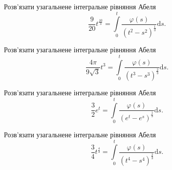 \documentclass[12pt]{extarticle}
\begin{document}
\begin{Exercise}
Розв’язати узагальнене інтегральне рівняння Абеля \[\dfrac{9}{20} t^{\frac{10}{3}} = \int\limits_{0}^{t} \dfrac{\varphi(s)}{(t^2-s^2)^{\frac{1}{3}}} \mathrm{d}s.\]
\end{Exercise}

\begin{Exercise}
Розв’язати узагальнене інтегральне рівняння Абеля \[\dfrac{4\pi}{9\sqrt{3}} t^3 = \int\limits_{0}^{t} \dfrac{\varphi(s)}{(t^3-s^3)^{\frac{2}{3}}} \mathrm{d}s.\]
\end{Exercise}

\begin{Exercise}
Розв’язати узагальнене інтегральне рівняння Абеля \[\dfrac{3}{2} e^{t} = \int\limits_{0}^{t} \dfrac{\varphi(s)}{(e^t-e^s)^{\frac{1}{3}}} \mathrm{d}s.\]
\end{Exercise}

\begin{Exercise}
Розв’язати узагальнене інтегральне рівняння Абеля \[\dfrac{3}{4} t^{\frac{4}{3}} = \int\limits_{0}^{t} \dfrac{\varphi(s)}{(t^4-s^4)^{\frac{2}{3}}} \mathrm{d}s.\]
\end{Exercise}
\end{document}
